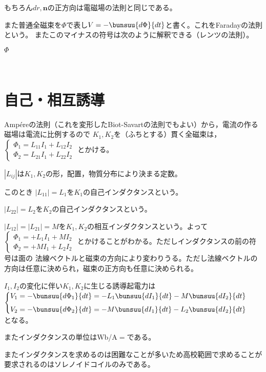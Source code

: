   もちろん$dr,\bm{n}$の正方向は電磁場の法則と同じである。

  また普通全磁束を$\Phi$で表し$V=-\bunsuu{d\Phi}{dt}$と書く。これをFaradayの法則という。
  またこのマイナスの符号は次のように解釈できる（レンツの法則）。

  $\Phi$

  ﻿\section{自己・相互誘導}

  Amp\'ereの法則（これを変形したBiot-Savartの法則でもよい）から，電流の作る磁場は電流に比例するので
  $K_1, K_2$を（ふちとする）貫く全磁束は，%
  $%
  \begin{cases}
   \Phi_1=L_{11}I_1+L_{12}I_2\\
   \Phi_2=L_{21}I_1+L_{22}I_2
  \end{cases}$%
  とかける。

  $|L_{ij}|$は$K_1, K_2$の形，配置，物質分布により決まる定数。

  このとき $|L_{11}|=L_1$を$K_1$の自己インダクタンスという。

  \hphantom{このとき} $|L_{22}|=L_2$を$K_2$の自己インダクタンスという。

  \hphantom{このとき} $|L_{12}|=|L_{21}|=M$を$K_1,K_2$の相互インダクタンスという。よって%
  $\begin{cases}
    \Phi_1=+L_{1}I_1+MI_2\\
    \Phi_2=+MI_1+L_{2}I_2
   \end{cases}$%
   とかけることがわかる。ただしインダクタンスの前の符号は面の
   法線ベクトルと磁束の方向により変わりうる。ただし法線ベクトルの方向は任意に決められ，磁束の正方向も任意に決められる。

   $I_1,I_2$の変化に伴い$K_1,K_2$に生じる誘導起電力は
   $\begin{cases}
     V_1=-\bunsuu{d\Phi_1}{dt}=-L_{1}\bunsuu{dI_1}{dt}-M\bunsuu{dI_2}{dt}\\[4pt]
     V_2=-\bunsuu{d\Phi_2}{dt}=-M\bunsuu{dI_1}{dt}-L_{2}\bunsuu{dI_2}{dt}
    \end{cases}$
    となる。

    またインダクタンスの単位は\unit{Wb/A}${}={}$\unit{}である。

    またインダクタンスを求めるのは困難なことが多いため高校範囲で求めることが要求されるのはソレノイドコイルのみである。


